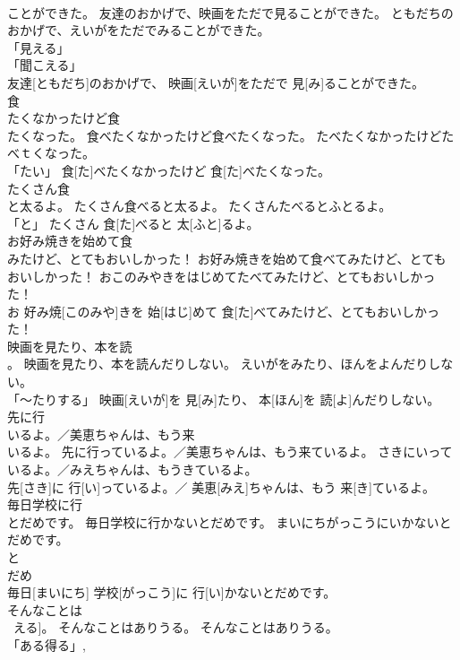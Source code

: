 \documentclass[8pt]{extreport}
\begin{document}
\begin{CJK}{UTF8}{min}
\\	ことができた。	友達のおかげで、映画をただで見ることができた。	ともだちのおかげで、えいがをただでみることができた。	
\\	「見える」 
\\	「聞こえる」 
\\	友達[ともだち]のおかげで、 映画[えいが]をただで 見[み]ることができた。		
\\	食
\\	たくなかったけど食
\\	たくなった。	食べたくなかったけど食べたくなった。	たべたくなかったけどたべｔくなった。	
\\	「たい」	食[た]べたくなかったけど 食[た]べたくなった。		
\\	たくさん食
\\	と太るよ。	たくさん食べると太るよ。	たくさんたべるとふとるよ。	
\\	「と」	たくさん 食[た]べると 太[ふと]るよ。		
\\	お好み焼きを始めて食
\\	みたけど、とてもおいしかった！	お好み焼きを始めて食べてみたけど、とてもおいしかった！	おこのみやきをはじめてたべてみたけど、とてもおいしかった！	
\\	お 好み焼[このみや]きを 始[はじ]めて 食[た]べてみたけど、とてもおいしかった！		
\\	映画を見たり、本を読
\\	。	映画を見たり、本を読んだりしない。	えいがをみたり、ほんをよんだりしない。	
\\	「～たりする」	映画[えいが]を 見[み]たり、 本[ほん]を 読[よ]んだりしない。		
\\	先に行
\\	いるよ。／美恵ちゃんは、もう来
\\	いるよ。	先に行っているよ。／美恵ちゃんは、もう来ているよ。	さきにいっているよ。／みえちゃんは、もうきているよ。	
\\	先[さき]に 行[い]っているよ。／ 美恵[みえ]ちゃんは、もう 来[き]ているよ。		
\\	毎日学校に行
\\	とだめです。	毎日学校に行かないとだめです。	まいにちがっこうにいかないとだめです。	
\\	と
\\	だめ
\\	毎日[まいにち] 学校[がっこう]に 行[い]かないとだめです。		
\\	そんなことは
\\	~える]。	そんなことはありうる。	そんなことはありうる。	
\\	「ある得る」, 

\end{CJK}
\end{document}
